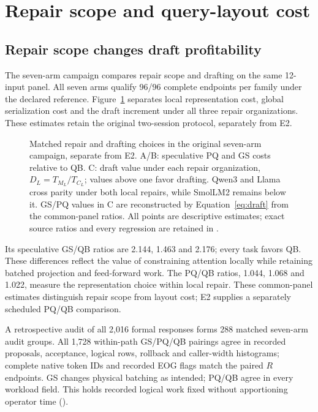 \section{Repair scope and query-layout cost}
\label{sec:results}
\subsection{Repair scope changes draft profitability}
\label{sec:economics}
The seven-arm campaign compares repair scope and drafting on the same 12-input panel. All seven arms qualify 96/96 complete endpoints per family under the declared reference. Figure~\ref{fig:cost} separates local representation cost, global serialization cost and the draft increment under all three repair organizations. These estimates retain the original two-session protocol, separately from E2.

\begin{figure}[t]\centering
\resizebox{\textwidth}{!}{}
\caption{Matched repair and drafting choices in the original seven-arm campaign, separate from E2. A/B: speculative PQ and GS costs relative to QB. C: draft value under each repair organization, $D_L=T_{M_L}/T_{C_L}$; values above one favor drafting. Qwen3 and Llama cross parity under both local repairs, while SmolLM2 remains below it. GS/PQ values in C are reconstructed by Equation~\ref{eq:draft} from the common-panel ratios. All points are descriptive estimates; exact source ratios and every regression are retained in .}
\label{fig:cost}
\end{figure}

Its speculative GS/QB ratios are 2.144, 1.463 and 2.176; every task favors QB. These differences reflect the value of constraining attention locally while retaining batched projection and feed-forward work. The PQ/QB ratios, 1.044, 1.068 and 1.022, measure the representation choice within local repair. These common-panel estimates distinguish repair scope from layout cost; E2 supplies a separately scheduled PQ/QB comparison.

A retrospective audit of all 2,016 formal responses forms 288 matched seven-arm audit groups. All 1,728 within-path GS/PQ/QB pairings agree in recorded proposals, acceptance, logical rows, rollback and caller-width histograms; complete native token IDs and recorded EOG flags match the paired $R$ endpoints. GS changes physical batching as intended; PQ/QB agree in every workload field. This holds recorded logical work fixed without apportioning operator time ().

